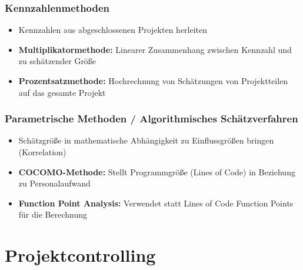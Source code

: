 \documentclass[11pt,a4paper]{article}
\begin{document}
\begin{minipage}[t]{0.49\textwidth}

\subsubsection{Kennzahlenmethoden}

\begin{itemize}
\item Kennzahlen aus abgeschlossenen Projekten herleiten
\item \textbf{Multiplikatormethode:} Linearer Zusammenhang zwischen Kennzahl und zu schätzender Größe
\item \textbf{Prozentsatzmethode:} Hochrechnung von Schätzungen von Projektteilen auf das gesamte Projekt
\end{itemize}

\subsubsection{Parametrische Methoden / Algorithmisches Schätzverfahren}

\begin{itemize}
	\item Schätzgröße in mathematische Abhängigkeit zu Einflussgrößen
bringen (Korrelation)
	\item \textbf{COCOMO-Methode:} Stellt Programmgröße (Lines of Code) in Beziehung zu Personalaufwand
	\item \textbf{Function Point Analysis:} Verwendet statt Lines of Code Function Points für die Berechnung
\end{itemize}
\end{minipage}

\section{Projektcontrolling}
\end{document}
